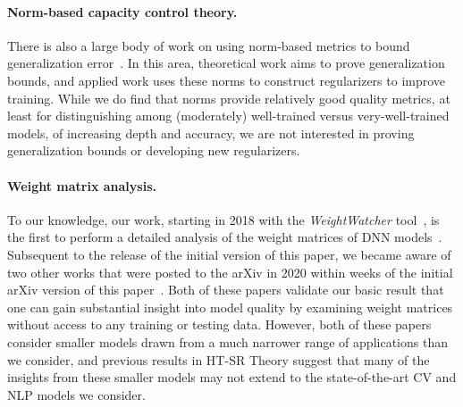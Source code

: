 \paragraph{Norm-based capacity control theory.}

There is also a large body of work on using norm-based metrics to bound generalization error~\cite{NTS15, BFT17_TR, LMBx18_TR}.
In this area, theoretical work aims to prove generalization bounds, and applied work uses these norms to construct regularizers to improve training.
While we do find that norms provide relatively good quality metrics, at least for distinguishing among (moderately) well-trained versus 
very-well-trained models, of increasing depth and accuracy, 
we are not interested in proving generalization bounds or developing new regularizers.

\paragraph{Weight matrix analysis.}
To our knowledge, our work, starting in 2018 with the \emph{WeightWatcher} tool~\cite{weightwatcher_package}, is the first to perform a detailed analysis of the weight matrices of DNN models~\cite{MM18_TR, MM19_HTSR_ICML, MM20_SDM}.
Subsequent to the release of the initial version of this paper, we became aware of two other works that were posted to the arXiv in 2020 within weeks of the initial arXiv version of this paper~\cite{EJRUY20_TR,UKGBT20_TR}.
Both of these papers validate our basic result that one can gain substantial insight into model quality by examining weight matrices without access to any training or testing data.
However, both of these papers consider smaller models drawn from a much narrower range of applications than we consider, and previous results in HT-SR Theory suggest that many of the insights from these smaller models may not extend to the state-of-the-art CV and NLP models we consider.




